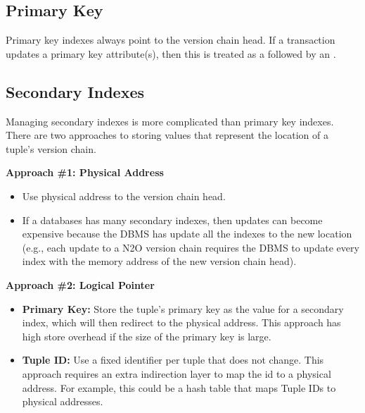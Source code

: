 \documentclass[11pt]{article}
\begin{document}
\subsection*{Primary Key}
Primary key indexes always point to the version chain head.
If a transaction updates a primary key attribute(s), then this is treated as a  
followed by an .

\subsection*{Secondary Indexes}
Managing secondary indexes is more complicated than primary key indexes. There are two approaches 
to storing values that represent the location of a tuple's version chain.

\textbf{Approach \#1: Physical Address}
\begin{itemize}
    \item
    Use physical address to the version chain head.
    \item
    If a databases has many secondary indexes, then updates can become expensive because the DBMS 
    has update all the indexes to the new location (e.g., each update to a N2O version chain 
    requires the DBMS to update every index with the memory address of the new version chain head).
\end{itemize}

\textbf{Approach \#2: Logical Pointer}
\begin{itemize}
    \item \textbf{Primary Key:}
    Store the tuple's primary key as the value for a secondary index, which will then 
    redirect to the physical address. This approach has high store overhead if the size of 
    the primary key is large.

    \item \textbf{Tuple ID:}
    Use a fixed identifier per tuple that does not change. This approach requires an extra 
    indirection layer to map the id to a physical address. For example, this could be a hash table 
    that maps Tuple IDs to physical addresses.
\end{itemize}

\newpage


\end{document}
